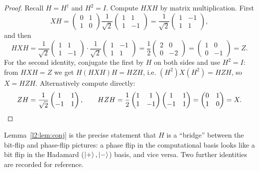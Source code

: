 \begin{proof}
Recall $H=H^{\dagger}$ and $H^{2}=I$. Compute $HXH$ by matrix multiplication.
First
\[
  XH=\begin{pmatrix}0&1\\1&0\end{pmatrix}
     \frac{1}{\sqrt2}\begin{pmatrix}1&1\\1&-1\end{pmatrix}
    =\frac{1}{\sqrt2}\begin{pmatrix}1&-1\\1&1\end{pmatrix},
\]
and then
\[
  HXH=\frac{1}{\sqrt2}\begin{pmatrix}1&1\\1&-1\end{pmatrix}\cdot
      \frac{1}{\sqrt2}\begin{pmatrix}1&-1\\1&1\end{pmatrix}
     =\frac{1}{2}\begin{pmatrix}2&0\\0&-2\end{pmatrix}
     =\begin{pmatrix}1&0\\0&-1\end{pmatrix}=Z.
\]
For the second identity, conjugate the first by $H$ on both sides and use
$H^{2}=I$: from $HXH=Z$ we get $H(HXH)H=HZH$, i.e. $(H^{2})X(H^{2})=HZH$, so
$X=HZH$. Alternatively compute directly:
\[
  ZH=\frac{1}{\sqrt2}\begin{pmatrix}1&1\\-1&1\end{pmatrix},\qquad
  HZH=\frac{1}{2}\begin{pmatrix}1&1\\1&-1\end{pmatrix}
      \begin{pmatrix}1&1\\-1&1\end{pmatrix}
     =\begin{pmatrix}0&1\\1&0\end{pmatrix}=X. \qedhere
\]
\end{proof}

Lemma~\ref{l2:lem:conj} is the precise statement that $H$ is a ``bridge'' between
the bit-flip and phase-flip pictures: a phase flip in the computational basis
looks like a bit flip in the Hadamard ($\ket{+},\ket{-}$) basis, and vice versa.
Two further identities are recorded for reference.

